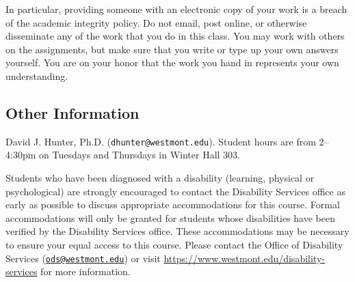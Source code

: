 \documentclass[
  twoside]{article}
\begin{document}
In particular, providing someone with an electronic copy of your work is
a breach of the academic integrity policy. Do not email, post online, or
otherwise disseminate any of the work that you do in this class. You may
work with others on the assignments, but make sure that you write or
type up your own answers yourself. You are on your honor that the work
you hand in represents your own understanding.

\hypertarget{other-information}{%
\subsection{Other Information}\label{other-information}}

\begin{description} \small

\item[Professor:] David J. Hunter, Ph.D.
  (\verb!dhunter@westmont.edu!). Student hours are from 2--4:30pm on Tuesdays and Thursdays in Winter Hall 303.

\item[Accommodations for Students with Disabilities:] Students who have been diagnosed with a disability (learning, physical or psychological) are strongly encouraged to contact the Disability Services office as early as possible to discuss appropriate accommodations for this course. Formal accommodations will only be granted for students whose disabilities have been verified by the Disability Services office.  These accommodations may be necessary to ensure your equal access to this course.  Please contact the Office of Disability Services (\href{mailto:ods@westmont.edu}{\tt ods@westmont.edu}) or visit \url{https://www.westmont.edu/disability-services} for more information.


\end{description}
\end{document}
